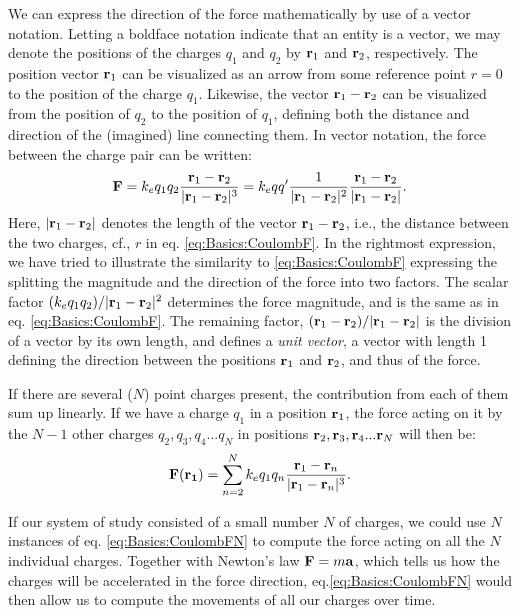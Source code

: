 We can express the direction of the force mathematically by use of a vector notation. Letting a boldface notation indicate that an entity is a vector, we may denote the positions of the charges $q_1$ and $q_2$ by ${\bf r}_1$ and ${\bf r}_2$, respectively. The position vector ${\bf r}_1$ can be visualized as an arrow from some reference point $r=0$ to the position of the charge $q_1$. Likewise, the vector ${\bf r}_1-{\bf r}_2$ can be visualized from the position of $q_2$ to the position of $q_1$, defining both the distance and direction of the (imagined) line connecting them. In vector notation, the force between the charge pair can be written:
\begin{equation}
{\bf F} = k_e q_1 q_2 \frac{{\bf r}_1-{\bf r}_2}{|{\bf r}_1-{\bf r}_2|^3} = k_e  qq'  \frac{1}{|{\bf r}_1-{\bf r}_2|^2} \frac{{\bf r}_1-{\bf r}_2}{|{\bf r}_1-{\bf r}_2|}.
\label{eq:Basics:CoulombFvec}
\end{equation}
Here, $|{\bf r}_1-{\bf r}_2|$ denotes the length of the vector ${\bf r}_1-{\bf r}_2$, i.e., the distance between the two charges, cf., $r$ in eq. \ref{eq:Basics:CoulombF}. In the rightmost expression, we have tried to illustrate the similarity to \ref{eq:Basics:CoulombF} expressing the splitting the magnitude and the direction of the force into two factors. The scalar factor $(k_e q_1q_2)/|{\bf r}_1-{\bf r}_2|^2$ determines the force magnitude, and is the same as in eq. \ref{eq:Basics:CoulombF}. The remaining factor, $({\bf r}_1-{\bf r}_2)/|{\bf r}_1-{\bf r}_2|$ is the division of a vector by its own length, and defines a \textit{unit vector}, a vector with length 1 defining the direction between the positions ${\bf r}_1$ and ${\bf r}_2$, and thus of the force. 

If there are several ($N$) point charges present, the contribution from each of them sum up linearly. If we have a charge $q_1$ in a position ${\bf r}_1$, the force acting on it by the $N-1$ other charges $q_2, q_3, q_4 ... q_{N}$ in positions ${\bf r}_2, {\bf r}_3, {\bf r}_4 ... {\bf r}_{N}$ will then be:
\begin{equation}
{\bf F}({\bf r_1}) = \sum_{n=2}^{N} k_e q_1 q_n \frac{{\bf r}_1-{\bf r}_n}{|{\bf r}_1-{\bf r}_n|^3}.
\label{eq:Basics:CoulombFN}
\end{equation}

If our system of study consisted of a small number $N$ of charges, we could use $N$ instances of eq. \ref{eq:Basics:CoulombFN} to compute the force acting on all the $N$ individual charges. Together with Newton's law ${\bf F} = m {\bf a}$, which tells us how the charges will be accelerated in the force direction, eq.\ref{eq:Basics:CoulombFN} would then allow us to compute the movements of all our charges over time. 

